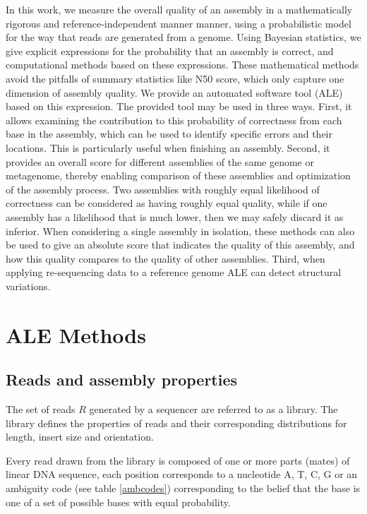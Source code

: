 \documentclass[phd,tocprelim]{cornell}
\begin{document}
In this work, we measure the overall quality of an assembly in a mathematically rigorous and reference-independent manner manner, using a probabilistic model for the way that reads are generated from a genome.  Using Bayesian statistics, we give explicit expressions for the probability that an assembly is correct, and computational methods based on these expressions.  These mathematical methods avoid the pitfalls of summary statistics like N50 score, which only capture one dimension of assembly quality. We provide an automated software tool (ALE) based on this expression.  The provided tool may be used in three ways.  First, it allows examining the contribution to this probability of correctness from each base in the assembly, which can be used to identify specific errors and their locations.  This is particularly useful when finishing an assembly.  Second, it provides an overall score for different assemblies of the same genome or metagenome, thereby enabling comparison of these assemblies and optimization of the assembly process.  Two assemblies with roughly equal likelihood of correctness can be considered as having roughly equal quality, while if one assembly has a likelihood that is much lower, then we may safely discard it as inferior.  When considering a single assembly in isolation, these methods can also be used to give an absolute score that indicates the quality of this assembly, and how this quality compares to the quality of other assemblies.  Third, when applying re-sequencing data to a reference genome ALE can detect structural variations.


\chapter{ALE Methods} %
\label{cha:ALE Methods}

\section{Reads and assembly properties}

The set of reads $R$ generated by a sequencer are referred to as a library. The library defines the properties of reads and their corresponding distributions for length, insert size and orientation.

Every read drawn from the library is composed of one or more parts (mates) of linear DNA sequence, each position corresponds to a nucleotide {\color{red} A}, {\color{blue} T}, {\color{MyDarkGreen} C}, {\color{orange} G} or an ambiguity code (see table \ref{ambcodes}) corresponding to the belief that the base is one of a set of possible bases with equal probability.
\end{document}
